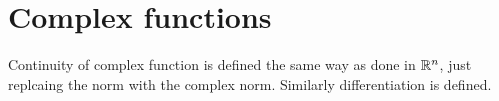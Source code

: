 \section{Complex functions}
\begin{definition}
  Continuity of complex function is defined the same way as done in $\mathbb{R}^n$, just replcaing the norm with the complex norm. Similarly differentiation is defined.
\end{definition}
